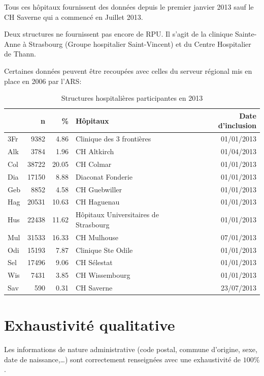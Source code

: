 \documentclass[12pt,english,french,twoside]{report}\usepackage[]{graphicx}\usepackage[]{color}
\begin{document}
Tous ces hôpitaux fournissent des données depuis le premier janvier 2013 sauf le CH Saverne qui a commencé en Juillet 2013.

Deux structures ne fournissent pas encore de RPU. Il s'agit de la clinique Sainte-Anne à Strasbourg (Groupe hospitalier Saint-Vincent) et du Centre Hospitalier de Thann.

Certaines données peuvent être recoupées avec celles du serveur régional mis en place en 2006 par l'ARS: 


\begin{table}[ht]
\centering
\begin{tabular}{|l|r|r|l|r|}
  \hline
 & n & \% & Hôpitaux & Date d'inclusion \\ 
  \hline
3Fr & 9382 & 4.86 & Clinique des 3 frontières & 01/01/2013 \\ 
  Alk & 3784 & 1.96 & CH Altkirch & 01/04/2013 \\ 
  Col & 38722 & 20.05 & CH Colmar & 01/01/2013 \\ 
  Dia & 17150 & 8.88 & Diaconat Fonderie & 01/01/2013 \\ 
  Geb & 8852 & 4.58 & CH Guebwiller & 01/01/2013 \\ 
  Hag & 20531 & 10.63 & CH Haguenau & 01/01/2013 \\ 
  Hus & 22438 & 11.62 & Hôpitaux Universitaires de Strasbourg & 01/01/2013 \\ 
  Mul & 31533 & 16.33 & CH Mulhouse & 07/01/2013 \\ 
  Odi & 15193 & 7.87 & Clinique Ste Odile & 01/01/2013 \\ 
  Sel & 17496 & 9.06 & CH Sélestat & 01/01/2013 \\ 
  Wis & 7431 & 3.85 & CH Wissembourg & 01/01/2013 \\ 
  Sav & 590 & 0.31 & CH Saverne & 23/07/2013 \\ 
   \hline
\end{tabular}
\caption{Structures hospitalières participantes en 2013} 
\label{tab1}
\end{table}



\section{Exhaustivité qualitative}

Les informations de nature administrative (code postal, commune d'origine, sexe, date de naissance,\dots ) sont correctement renseignées avec une exhaustivité de $100\%$.
\end{document}
